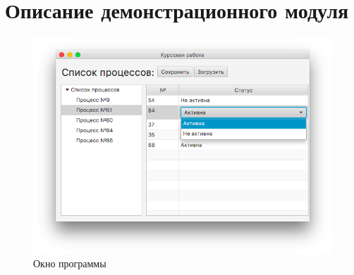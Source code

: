 \documentclass[russian,utf8,simple,hpadding=10mm,vpadding=20mm]{eskdtext}
\begin{document}
\renewcommand{\lstlistingname}{Класс}
















\newpage
\parindent=15mm
\section{Описание демонстрационного модуля}

\begin{figure}[!h]
    \centering
    \includegraphics[width=1\textwidth]{screenshots/1.png}
    \caption{Окно программы}
    \label{fig:mesh1}
\end{figure}
\end{document}
